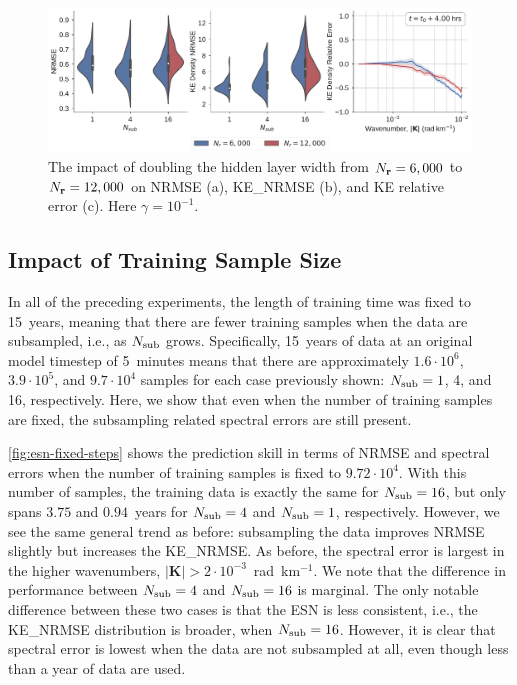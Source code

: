 \begin{figure}
    \centering
    \includegraphics[width=\textwidth]{../figures/rc_reservoir_size.pdf}
    \caption{The impact of doubling the hidden layer width from $N_{\mathbf{r}}=6,000$ to
        $N_{\mathbf{r}}=12,000$ on NRMSE (a), KE\_NRMSE (b), and KE relative error (c).
        Here $\gamma=10^{-1}$.
    }
    \label{fig:esn-size}
\end{figure}

\subsection{Impact of Training Sample Size}
\label{subsec:esn-fixed-steps}

In all of the preceding experiments, the length of training time was fixed to
15~years, meaning that there are fewer training samples when the data are
subsampled, i.e., as $N_\text{sub}$ grows.
Specifically, 15~years of data at an original model timestep of 5~minutes means
that there are approximately
$1.6\cdot10^{6}$, $3.9\cdot10^5$, and $9.7\cdot10^4$ samples
for each case previously shown: $N_\text{sub}=1$, 4, and 16, respectively.
Here, we show that even when the number of training samples are fixed, the
subsampling related spectral errors are still present.

\cref{fig:esn-fixed-steps} shows the prediction skill in terms of NRMSE and
spectral errors when the number of training samples is fixed to $9.72\cdot10^4$.
With this number of samples, the training data is exactly the same for
$N_\text{sub}=16$, but only spans $3.75$ and $0.94$~years for $N_\text{sub}=4$ and $N_\text{sub}=1$,
respectively.
However, we see the same general trend as before: subsampling the data improves
NRMSE slightly but increases the KE\_NRMSE.
As before, the spectral error is largest in the higher wavenumbers,
$|\mathbf{K}| > 2\cdot10^{-3}$~rad~km$^{-1}$.
We note that the difference in performance between $N_\text{sub}=4$ and $N_\text{sub}=16$ is
marginal.
The only notable difference between these two cases is that the ESN is less
consistent, i.e., the KE\_NRMSE distribution is broader, when $N_\text{sub}=16$.
However, it is clear that spectral error is lowest when the data are not
subsampled at all, even though less than a year of data are used.

